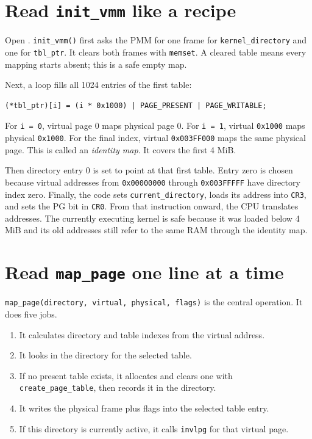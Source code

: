 \section{Read \texttt{init\_vmm} like a recipe}
Open . \texttt{init\_vmm()} first asks the PMM for one frame for \texttt{kernel\_directory} and one for \texttt{tbl\_ptr}. It clears both frames with \texttt{memset}. A cleared table means every mapping starts absent; this is a safe empty map.

Next, a loop fills all 1024 entries of the first table:
\begin{verbatim}
(*tbl_ptr)[i] = (i * 0x1000) | PAGE_PRESENT | PAGE_WRITABLE;
\end{verbatim}
For \texttt{i = 0}, virtual page 0 maps physical page 0. For \texttt{i = 1}, virtual \texttt{0x1000} maps physical \texttt{0x1000}. For the final index, virtual \texttt{0x003FF000} maps the same physical page. This is called an \emph{identity map}. It covers the first 4 MiB.

Then directory entry 0 is set to point at that first table. Entry zero is chosen because virtual addresses from \texttt{0x00000000} through \texttt{0x003FFFFF} have directory index zero. Finally, the code sets \texttt{current\_directory}, loads its address into \texttt{CR3}, and sets the PG bit in \texttt{CR0}. From that instruction onward, the CPU translates addresses. The currently executing kernel is safe because it was loaded below 4 MiB and its old addresses still refer to the same RAM through the identity map.

\section{Read \texttt{map\_page} one line at a time}
\texttt{map\_page(directory, virtual, physical, flags)} is the central operation. It does five jobs.
\begin{enumerate}
\item It calculates directory and table indexes from the virtual address.
\item It looks in the directory for the selected table.
\item If no present table exists, it allocates and clears one with \texttt{create\_page\_table}, then records it in the directory.
\item It writes the physical frame plus flags into the selected table entry.
\item If this directory is currently active, it calls \texttt{invlpg} for that virtual page.
\end{enumerate}

